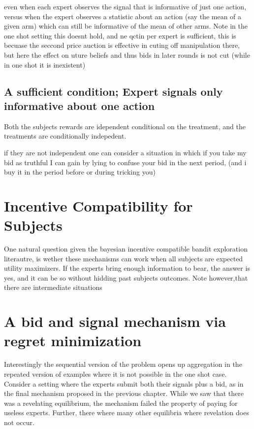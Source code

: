 even when each expert observes the signal that is informative of just one action, versus when the expert observes a statistic about an action (say the mean of a given arm) which can still be informative of the mean of other arms. Note in the one shot setting this doesnt hold, and ne qctin per expert is sufficient, this is becuase the seccond price auction is effective in cuting off manipulation there, but here the effect on uture beliefs and thus bids in later rounds is not cut (while in one shot it is inexistent)

\subsection{A sufficient condition; Expert signals only informative about one action}

Both the subjects rewards are idependent conditional on the treatment, and the treatments are conditionally indepedent.

if they are not independent one can consider a situation in which if you take my bid as truthful I can gain by lying to confuse your bid in the next period, (and i buy it in the period before or during tricking you)




\section{Incentive Compatibility for Subjects}

One natural question given the bayesian incentive compatible bandit exploration literautre, is wether these mechanisms can work when all subjects are expected utility maximizers. If the experts bring enough information to bear, the answer is yes, and it can be so without hidding past subjects outcomes. Note however,that there are intermediate situations 



\section{A bid and signal mechanism via regret minimization}

Interestingly the sequential version of the problem opens up aggregation in the repeated version of examples where it is not possible in the one shot case. Consider a setting where the experts submit both their signals plus a bid, as in the final mechanism proposed in the previous chapter. While we saw that there was a revelating equilibrium, the mechanism failed the property of paying for useless experts. Further, there where many other equilibria where revelation does not occur. 

